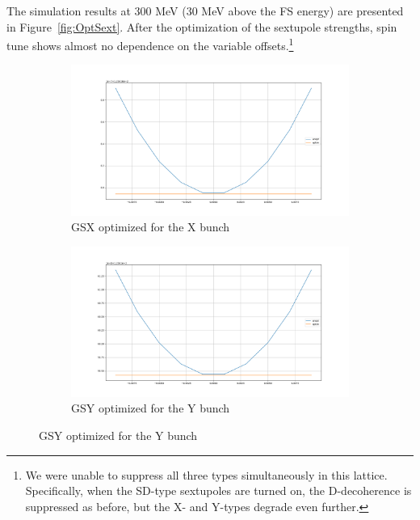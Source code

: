 \documentclass{article}
\begin{document}
The simulation results at 300 MeV (30 MeV above the FS energy) are presented in Figure~\ref{fig:OptSext}. After the optimization of the sextupole strengths, spin tune shows almost no dependence on the variable offsets.\footnote{We were unable to suppress all three types simultaneously in this lattice. Specifically, when the SD-type sextupoles are turned on, the D-decoherence is suppressed as before, but the X- and Y-types degrade even further.}
\begin{figure}
  \centering
  \begin{subfigure}[b]{\textwidth}\centering
    \includegraphics[width=\textwidth]{img/SPINTUNE_X_GSX_optim}
    \caption{GSX optimized for the X bunch}
  \end{subfigure}
  \begin{subfigure}[b]{\textwidth}\centering
    \includegraphics[width=\textwidth]{img/SPINTUNE_Y_GSY_optim}
    \caption{GSY optimized for the Y bunch}
  \end{subfigure}
\end{figure}
\end{document}
